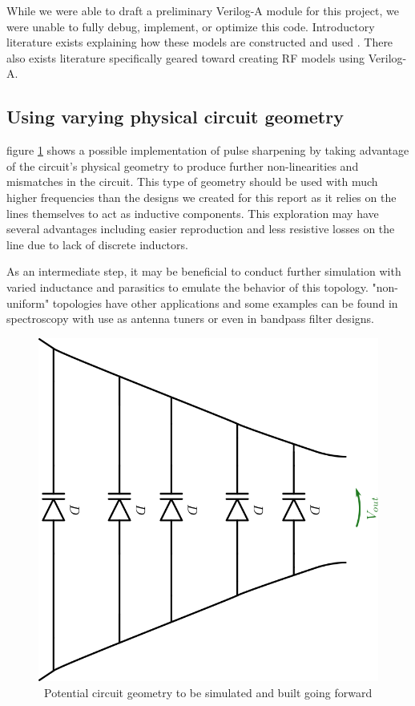 \documentclass[journal]{IEEEtran} \usepackage[english]{babel}
\begin{document}
While we were able to draft a preliminary Verilog-A module for this project,
we were unable to fully debug, implement, or optimize this code.
Introductory literature exists explaining how these models are constructed
and used \cite{VerilogAFun}. There also exists literature specifically geared
toward creating RF models using Verilog-A\cite{VerilogARF}.
    
    


\subsection{Using varying physical circuit geometry}

figure \ref{fig:WeirdGeo} shows a possible implementation of pulse sharpening by
taking advantage of the circuit's physical geometry to produce further
non-linearities and mismatches in the circuit. This type of geometry should be
used with much higher frequencies than the designs we created for this report as
it relies on the lines themselves to act as inductive components. This exploration may have several advantages including easier reproduction and less
resistive losses on the line due to lack of discrete inductors.

As an intermediate step, it may be beneficial to conduct further simulation with
varied inductance and parasitics to emulate the behavior of this topology.
"non-uniform" topologies have other applications and some examples can be found
in spectroscopy\cite{palmer2014performance} with use as antenna
tuners\cite{cure2012non} or even in bandpass filter
designs\cite{NonUniformBandpass}.


\begin{figure}[htb]
\centering
\includegraphics[width=0.45\linewidth]{WeirdNTLTGeometry.png}
\caption{\ Potential circuit geometry to be simulated and built going forward
}\label{fig:WeirdGeo}
\end{figure}
\end{document}
